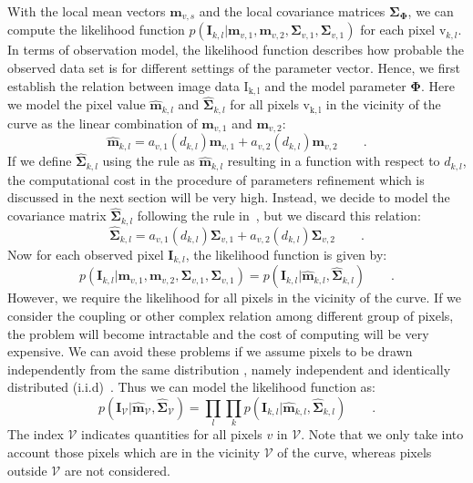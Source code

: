 \documentclass[conference]{IEEEtran}
\begin{document}
With the local mean vectors $\mathbf{m}_{v,s}$  and the local covariance matrices
$\mathbf{\Sigma}_{\mathbf{\Phi}}$, we can compute the
likelihood function   $p(\mathbf{I}_{k,l} | \mathbf{m}_{v,1}, \mathbf{m}_{v,2},
  \mathbf{\Sigma}_{v,1}, \mathbf{\Sigma}_{v,1})$ for each pixel
  $\mathrm{v}_{k,l}$. In terms of observation model, the likelihood
  function describes how probable the observed data set is for
  different settings of the parameter vector. Hence, we first establish
  the relation between image data $\mathrm{I_{k,l}}$ and the model
  parameter $\mathbf{\Phi}$. Here we model the pixel value
  $\hat{\mathbf{m}}_{k,l}$ and $\hat{\mathbf{\Sigma}}_{k,l}$
  for all pixels $\mathrm{v_{k,l}}$ in the vicinity of the curve as the
  linear combination of $\mathbf{m}_{v,1}$ and $\mathbf{m}_{v,2}$:
  \begin{equation}
    \label{eq:meankl}
    \hat{\mathbf{m}}_{k,l} = a_{v,1}(d_{k,l})\mathbf{m}_{v,1} + a_{v,2}(d_{k,l})\mathbf{m}_{v,2}\qquad.
  \end{equation}
If we define  $\hat{\mathbf{\Sigma}}_{k,l}$ using the rule as
$\hat{\mathbf{m}}_{k,l}$ resulting in a function with respect to $d_{k,l}$, the computational cost in the procedure of
parameters refinement which is discussed in the next section  will be very high. Instead, we decide to
model the covariance matrix $\hat{\mathbf{\Sigma}}_{k,l}$ following the
rule in~\cite{hanek2004fitting}, but we discard this relation:
\begin{equation}
  \label{eq:sigmakl}
  \hat{\mathbf{\mathbf{\Sigma}}}_{k,l} = a_{v,1}(d_{k,l})\mathbf{\Sigma}_{v,1} + a_{v,2}(d_{k,l})\mathbf{\Sigma}_{v,2}\qquad.
\end{equation}
Now for each observed pixel $\mathbf{I}_{k,l}$, the likelihood
function is given by:
\begin{equation}
  \label{eq:likelihood}
p(\mathbf{I}_{k,l} | \mathbf{m}_{v,1}, \mathbf{m}_{v,2},
  \mathbf{\Sigma}_{v,1}, \mathbf{\Sigma}_{v,1}) = p(\mathbf{I}_{k,l} | \hat{\mathbf{\mathbf{m}}}_{k,l},\hat{\mathbf{\mathbf{\Sigma}}}_{k,l}) \qquad.
\end{equation}
However, we require the likelihood for all pixels in the vicinity of
the curve. If we consider the coupling or other complex relation among
different group of pixels, the problem will become intractable and the cost of computing will be very expensive. We can
avoid these problems if we assume pixels to be drawn independently from the same distribution
, namely independent and identically distributed
(i.i.d)~\cite{bishop2006pattern}. Thus we can model the likelihood function as:
\begin{equation}
  \label{eq:liklihoodall}
  p(\mathbf{I}_{\mathcal{V}} |
  \hat{\mathbf{\mathbf{m}}}_{\mathcal{V}},\hat{\mathbf{\mathbf{\Sigma}}}_{\mathcal{V}})
  = \prod_l \prod_k p(\mathbf{I}_{k,l} | \hat{\mathbf{\mathbf{m}}}_{k,l},\hat{\mathbf{\mathbf{\Sigma}}}_{k,l}) \qquad.
\end{equation}
The index $\mathcal{V}$ indicates quantities for all pixels $v$ in
$\mathcal{V}$. Note that we only take into account those pixels which are
in the vicinity $\mathcal{V}$ of the curve, whereas pixels outside
$\mathcal{V}$ are not considered.
\end{document}
